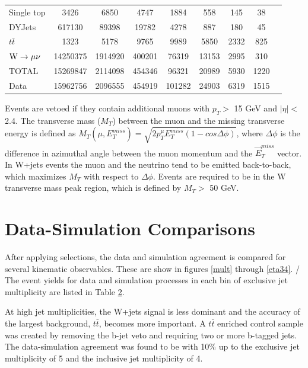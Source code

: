 \documentclass[oneside, letterpaper, oldfontcommands]{memoir}
\begin{document}
\begin{table}
\begin{table}
{\begin{tabular}{l|cccccccc}
   Single top        & 3426 & 6850 & 4747 & 1884 & 558 & 145 & 38 \\
   DYJets        & 617130 & 89398 & 19782 & 4278 & 887 & 180 & 45 \\
   $t\bar{t}$         & 1323 & 5178 & 9765 & 9989 & 5850 & 2332 & 825 \\
   $\mathrm{W} \rightarrow \mu\nu$        & 14250375 & 1914920 & 400201 & 76319 & 13153 & 2995 & 310 \\
 \hline
 TOTAL & 15269847 & 2114098 & 454346 & 96321 & 20989 & 5930 & 1220 \\
 \hline
 Data          & 15962756 & 2096555 & 454919 & 101282 & 24903 & 6319 & 1515 \\
 \end{tabular}}
 \label{tab:events}
 \end{table}

\qquad Events are vetoed if they contain additional muons with $p_{T} >$ 15 GeV and $|\eta| <$ 2.4. The transverse mass ($M_{T}$) between the muon and the missing transverse energy is defined as $M_{T}(\mu,E_{T}^{miss}) = \sqrt{2 p_{T}^{\mu} E_{T}^{miss} (1-cos\Delta\phi)}$, where $\Delta\phi$ is the difference in azimuthal angle between the muon momentum and the $\vec{E}_{T}^{miss}$ vector. In W+jets events the muon and the neutrino tend to be emitted back-to-back, which maximizes $M_{T}$ with respect to $\Delta\phi$. Events are required to be in the W transverse mass peak region, which is defined by $M_{T} >$ 50 GeV.

\section{Data-Simulation Comparisons}
\qquad After applying selections, the data and simulation agreement is compared for several kinematic observables. These are show in figures \ref{mult} through \ref{eta34}.
/
\qquad The event yields for data and simulation processes in each bin of exclusive jet multiplicity are listed in Table \ref{tab:events}.

\qquad At high jet multiplicities, the W+jets signal is less dominant and the accuracy of the largest background, $t\bar{t}$, becomes more important. A $t\bar{t}$ enriched control sample was created by removing the b-jet veto and requiring two or more b-tagged jets. The data-simulation agreement was found to be with 10\% up to the exclusive jet multiplicity of 5 and the inclusive jet multiplicity of 4. 


\end{table}
\end{document}
